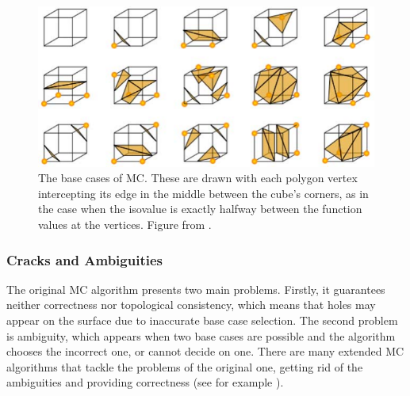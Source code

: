 \begin{figure}[H]
\centering
   \includegraphics[width=.5\textwidth]{Pictures/cubes.pdf}
   \caption{The base cases of \ac{MC}. These are drawn with each polygon vertex intercepting its edge in the middle between the cube's corners, as in the case when the isovalue is exactly halfway between the function values at the vertices. Figure from \cite{Marching2006}.}
   \label{fig:MC_basecase}
\end{figure}

\subsubsection{Cracks and Ambiguities}
The original \acf{MC} algorithm presents two main problems. Firstly, it guarantees neither correctness nor topological consistency, which means that holes may appear on the surface due to inaccurate base case selection. The second problem is ambiguity, which appears when two base cases are possible and the algorithm chooses the incorrect one, or cannot decide on one. There are many extended \ac{MC} algorithms that tackle the problems of the original one, getting rid of the ambiguities and providing correctness (see for example \cite{ExtendedMC}).
